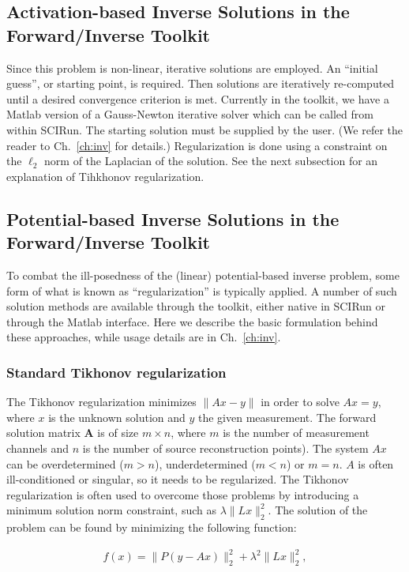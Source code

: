 \documentclass[fleqn,11pt,openany]{book}
\begin{document}
\subsection{Activation-based Inverse Solutions in the Forward/Inverse Toolkit}

Since this problem is non-linear, iterative solutions are employed. An
``initial guess'', or starting point, is required. Then
solutions are iteratively re-computed until a desired convergence criterion
is met. Currently in the toolkit, we have a Matlab version of a Gauss-Newton
iterative solver which can be called from within SCIRun. The starting
solution must be supplied by the user. (We refer the reader to
Ch.~\ref{ch:inv} for details.) Regularization is done using a constraint on
the $\ell_{2}$ norm of the Laplacian of the solution. See the next subsection
for an explanation of Tihkhonov regularization.

\subsection{Potential-based Inverse Solutions in the Forward/Inverse Toolkit}

To combat the ill-posedness of the (linear) potential-based inverse
problem, some form of what is known as ``regularization'' is typically
applied. A number of such solution methods are available through the
toolkit, either native in SCIRun or through the Matlab interface. Here we
describe the basic formulation behind these approaches, while usage details
are in Ch.~\ref{ch:inv}.

\subsubsection{Standard Tikhonov regularization}

The Tikhonov regularization minimizes $ \| Ax - y \|$ in order to solve $Ax=y$, where $x$ is the unknown solution and $y$ the given measurement. The forward solution matrix $\mathbf{A}$ is of size $m\times n$, where $m$ is the number of measurement channels and $n$ is the number of source reconstruction points).
The system $Ax$ can be overdetermined ($m > n$), underdetermined ($m <n$) or $m=n$. $A$ is often ill-conditioned or singular, so it needs to be regularized. The Tikhonov regularization is often used to overcome those problems by introducing a minimum solution norm constraint, such as $\lambda \|Lx\|_2^2$. The solution of the problem can be found by minimizing the following function:
\begin{center}
\begin{eqnarray}
    f (x) = \| P (y - A x) \|^{2}_{2} + \lambda^{2} \| Lx \|^{2}_{2},
\label{tik_problem}
\end{eqnarray}
\end{center}
\end{document}
